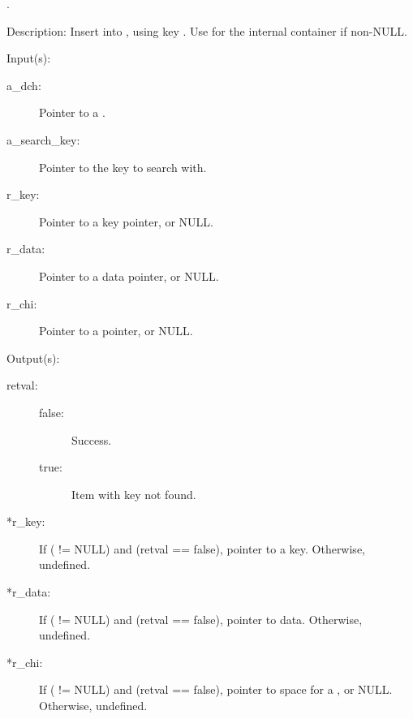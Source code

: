 \begin{capi}
\begin{capilist}
		\begin{description}\item[]
		\item[.]
		\end{description}
	\item[Description: ]
		Insert  into , using key
		.  Use  for the internal
		 container if non-NULL.
	\end{capilist}
\label{dch_remove}
	\begin{capilist}
	\item[Input(s): ]
		\begin{description}\item[]
		\item[a\_dch: ]
			Pointer to a .
		\item[a\_search\_key: ]
			Pointer to the key to search with.
		\item[r\_key: ]
			Pointer to a key pointer, or NULL.
		\item[r\_data: ]
			Pointer to a data pointer, or NULL.
		\item[r\_chi: ]
			Pointer to a  pointer, or NULL.
		\end{description}
	\item[Output(s): ]
		\begin{description}\item[]
		\item[retval: ]
			\begin{description}\item[]
			\item[false: ]
				Success.
			\item[true: ]
				Item with key  not	found.
			\end{description}
		\item[*r\_key: ]
			If ( != NULL) and (retval == false),
			pointer to a key.  Otherwise, undefined.
		\item[*r\_data: ]
			If ( != NULL) and (retval == false),
			pointer to data.  Otherwise, undefined.
		\item[*r\_chi: ]
			If ( != NULL) and (retval == false),
			pointer to space for a , or NULL.
			Otherwise, undefined.
		\end{description}

\end{capilist}
\end{capi}
